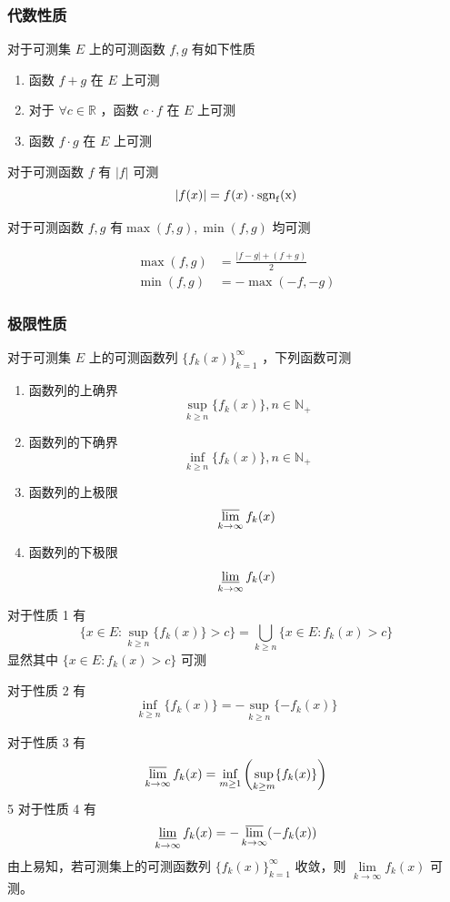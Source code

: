 \documentclass{ctexbook}
\newcommand{\no}{\noindent}
\newcommand{\pro}{\no{\bf 证明：}}
\newcommand{\R}{\mathbb{R}}
\newcommand{\ITEMS}{\begin{enumerate}[leftmargin=4em]}
\newcommand{\ITEME}{\end{enumerate}}
\begin{document}
\subsubsection{代数性质}
对于可测集 $E$ 上的可测函数 $f,g$ 有如下性质
\ITEMS
\item 函数 $f + g$ 在 $E$ 上可测
\item 对于 $\forall c\in \R$ ，函数 $c\cdot f$ 在 $E$ 上可测
\item 函数 $f \cdot g$ 在 $E$ 上可测
\ITEME

\no {\bf 推论：}

对于可测函数 $f$ 有 $\lvert f \rvert$ 可测
\[
\lvert f(x) \rvert = f(x) \cdot \operatorfont{sgn}_f(x)
\]

\no {\bf 推论：}

对于可测函数 $f,g$ 有$\max (f,g), \min(f,g)$ 均可测

\[
\begin{aligned}
	\max (f,g) &= \frac{|f-g| + (f+g)}{2}\\
	\min (f,g) &= -\max (-f,-g)
\end{aligned}
\]


\subsubsection{极限性质}

对于可测集 $E$ 上的可测函数列 $\{f_k (x)\}_{k=1}^\infty$ ，下列函数可测

\ITEMS
\item 函数列的上确界
\[
\sup_{k \ge n} \{f_k (x)\} , n\in \mathbb{N}_+
\]
\item 函数列的下确界
\[
\inf_{k \ge n} \{f_k (x)\} , n\in \mathbb{N}_+
\]
\item 函数列的上极限
\[
\varlimsup\limits_{k\to\infty} f_k(x)
\]
\item 函数列的下极限
\[
\varliminf\limits_{k\to\infty} f_k(x)
\]
\ITEME

\pro 

对于性质 1 有
\[
\{x\in E: \sup_{k\ge n}\{f_k(x)\} > c\} = \bigcup_{k\ge n} \{x\in E : f_k(x) > c\}
\]
显然其中 $\{x\in E : f_k(x) > c\}$ 可测

对于性质 2 有
\[
\inf_{k \ge n} \{f_k (x)\} = -\sup_{k \ge n}\{ -f_k (x)\}
\]

对于性质 3 有
\[
\varlimsup\limits_{k\to\infty} f_k(x) = \inf_{m \ge 1}\left( \sup_{k \ge m} \{f_k (x)\} \right)
\]
5
对于性质 4 有
\[
\varliminf\limits_{k\to\infty} f_k(x) = -\varlimsup\limits_{k\to\infty} (-f_k(x))
\]
\no {\bf 注：} 由上易知，若可测集上的可测函数列 $\{f_k (x)\}_{k=1}^\infty$ 收敛，则 $\lim\limits_{k\to\infty} f_k(x)$ 可测。 
\end{document}
